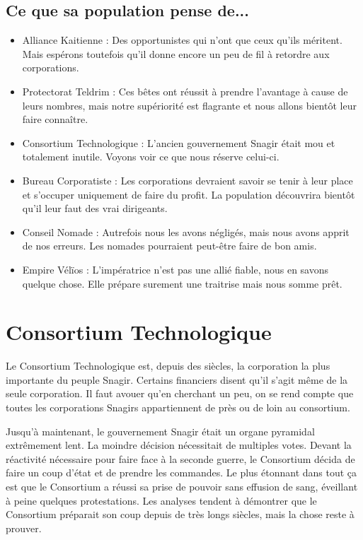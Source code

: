 \begin{multicols}{2}
\subsection{Ce que sa population pense de...}

\begin{itemize}
\item Alliance Kaitienne : Des opportunistes qui n'ont que ceux qu'ils méritent. Mais espérons toutefois qu'il donne encore un peu de fil à retordre aux corporations.
\item Protectorat Teldrim : Ces bêtes ont réussit à prendre l'avantage à cause de leurs nombres, mais notre supériorité est flagrante et nous allons bientôt leur faire connaître.
\item Consortium Technologique : L'ancien gouvernement Snagir était mou et totalement inutile. Voyons voir ce que nous réserve celui-ci.
\item Bureau Corporatiste : Les corporations devraient savoir se tenir à leur place et s'occuper uniquement de faire du profit. La population découvrira bientôt qu'il leur faut des vrai dirigeants.
\item Conseil Nomade : Autrefois nous les avons négligés, mais nous avons apprit de nos erreurs. Les nomades pourraient peut-être faire de bon amis.
\item Empire Vélïos : L'impératrice n'est pas une allié fiable, nous en savons quelque chose. Elle prépare surement une traitrise mais nous somme prêt.
\end{itemize}

\section{Consortium Technologique}

Le Consortium Technologique est, depuis des siècles, la corporation la plus importante du peuple Snagir. Certains financiers disent qu'il s'agit même de la seule corporation. Il faut avouer qu'en cherchant un peu, on se rend compte que toutes les corporations Snagirs appartiennent de près ou de loin au consortium.

Jusqu'à maintenant, le gouvernement Snagir était un organe pyramidal extrêmement lent. La moindre décision nécessitait de multiples votes. Devant la réactivité nécessaire pour faire face à la seconde guerre, le Consortium décida de faire un coup d'état et de prendre les commandes. Le plus étonnant dans tout ça est que le Consortium a réussi sa prise de pouvoir sans effusion de sang, éveillant à peine quelques protestations. Les analyses tendent à démontrer que le Consortium préparait son coup depuis de très longs siècles, mais la chose reste à prouver.


\end{multicols}
